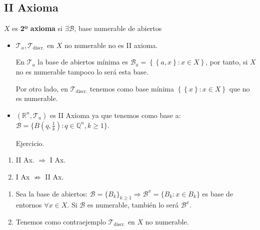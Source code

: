 \subsection{II Axioma}%
\label{sub:iiax}
\begin{defi}[II Ax.]
$X$ es \textbf{2º axioma} si $\exists \mathcal{B}$, base numerable de abiertos
\end{defi}

\begin{ej}
\begin{itemize}
    \item $\mathcal{T}_a, \mathcal{T}_{\text{discr.}}$ en $X$ no numerable no es II axioma.
    \begin{demo}
        En $\mathcal{T}_a$ la base de abiertos mínima es $\mathcal{B}_a = \left\{ \left\{ a, x \right\}: x \in X \right\}$, por tanto, si $X$ no es numerable
        tampoco lo será esta base.

        Por otro lado, en $\mathcal{T}_{\text{discr.}}$ tenemos como base mínima $\left\{ \left\{ x \right\}: x \in X \right\}$ que no es numerable.
    \end{demo}
    \item $\left( \mathbb{R}^n, \mathcal{T}_{u} \right)$ es II Axioma ya que tenemos como base a: $\mathcal{B} = \{B \left( q, \frac{1}{k}\right) : q \in \mathbb{Q}^n, k \ge 1 \}$.
    \begin{demo}
        Ejercicio.
    \end{demo}
\end{itemize}
\end{ej}

\begin{prop}
\begin{enumerate}
    \item II Ax. $\Rightarrow$ I Ax. 
    \item I Ax $\not \Rightarrow$ II Ax. 
\end{enumerate}
\end{prop}
\begin{demo}
\begin{enumerate}
    \item Sea la base de abiertos: $\mathcal{B} = \{B_k\}_{k \ge 1} \Rightarrow \mathcal{B}^x = \{B_k : x \in B_k\}$ es base de entornos $\forall x \in X$. Si $\mathcal{B}$ es numerable, también lo será $\mathcal{B}^x$.
    \item Tenemos como contraejemplo $\mathcal{T}_{\text{discr.}}$ en $X$ no numerable.
\end{enumerate}
\end{demo}

